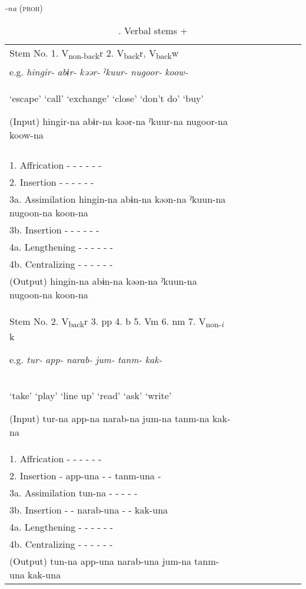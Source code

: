 \begin{table}
\caption{\label{tab:key:64}. Verbal stems +} \textmd{\textit{-na}}\textmd{ (\textsc{proh})}

\begin{tabular}{ll llllll}
\lsptoprule
Stem No.  1. V\textsubscript{non-back}r  2. V\textsubscript{back}r, V\textsubscript{back}w\\

  e.g.  \textit{hingir-}  \textit{abɨr-}  \textit{kəər-}  \textit{ˀkuur-}  \textit{nugoor-}  \textit{koow-}\\
 ‘escape’  ‘call’  ‘exchange’  ‘close’  ‘don’t do’  ‘buy’

  (Input)  hingir-na  abɨr-na  kəər-na  ˀkuur-na  nugoor-na  koow-na                           \\
\midrule                                                                                       \\
1.  Affrication  -  -  -  -  -  -                                                              \\
2.  Insertion  -  -  -  -  -  -                                                                \\
3a.  Assimilation  hingin-na  abɨn-na  kəən-na  ˀkuun-na  nugoon-na  koon-na                   \\
3b.  Insertion  -  -  -  -  -  -                                                               \\
4a.  Lengthening  -  -  -  -  -  -                                                             \\
4b.  Centralizing  -  -  -  -  -  -\\
\midrule
  (Output)  hingin-na  abɨn-na  kəən-na  ˀkuun-na  nugoon-na  koon-na                           \\

\tablevspace
Stem No.  2. V\textsubscript{back}r  3. pp  4. b  5. Vm  6. nm  7. V\textsubscript{non-}\textit{\textsubscript{i}} k

  e.g.  \textit{tur-}  \textit{app-}  \textit{narab-}  \textit{jum-}  \textit{tanm-}  \textit{kak-}\\
 ‘take’  ‘play’  ‘line up’  ‘read’  ‘ask’  ‘write’

  (Input)  tur-na  app-na  narab-na  jum-na  tanm-na  kak-na          \\
\midrule
1.  Affrication  -  -  -  -  -  -                                     \\
2.  Insertion  -  app-una  -  -  tanm-una  -                          \\
3a.  Assimilation  tun-na  -  -  -  -  -                              \\
3b.  Insertion  -  -  narab-una  -  -  kak-una                        \\
4a.  Lengthening  -  -  -  -  -  -                                    \\
4b.  Centralizing  -  -  -  -  -  -                                   \\
\midrule
  (Output)  tun-na  app-una  narab-una  jum-na  tanm-una  kak-una           \\


\end{tabular}
\end{table}
